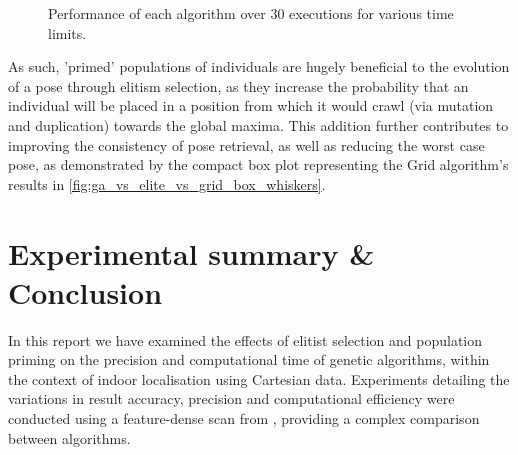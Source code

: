 \documentclass[authoryearcitations]{UoYCSproject}
\begin{document}
\begin{figure}
	\caption[Grid, Elitism, Benchmark time-adjusted performance.]{Performance of each algorithm over 30 executions for various time limits.}
	\label{fig:ga_vs_elite_vs_grid_box_whiskers}
\end{figure}

As such, 'primed' populations of individuals are hugely beneficial to the evolution of a pose through elitism selection, as they increase the probability that an individual will be placed in a position from which it would crawl (via mutation and duplication) towards the global maxima. This addition further contributes to improving the consistency of pose retrieval, as well as reducing the worst case pose, as demonstrated by the compact box plot representing the Grid algorithm's results in \autoref{fig:ga_vs_elite_vs_grid_box_whiskers}.





\chapter{Experimental summary \& Conclusion}
In this report we have examined the effects of elitist selection and population priming on the precision and computational time of genetic algorithms, within the context of indoor localisation using Cartesian data. Experiments detailing the variations in result accuracy, precision and computational efficiency were conducted using a feature-dense scan from \citet{Lenac2011-co}, providing a complex comparison between algorithms. 
\end{document}
